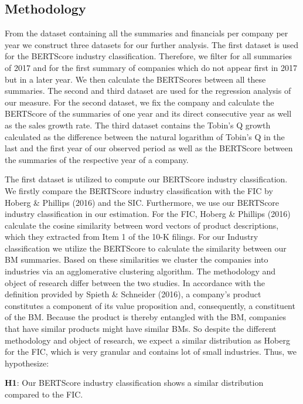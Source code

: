 \documentclass[
]{article}
\begin{document}
\subsection{Methodology}\label{methodology}

From the dataset containing all the summaries and financials per company
per year we construct three datasets for our further analysis. The first
dataset is used for the BERTScore industry classification. Therefore, we
filter for all summaries of 2017 and for the first summary of companies
which do not appear first in 2017 but in a later year. We then calculate
the BERTScores between all these summaries. The second and third dataset
are used for the regression analysis of our measure. For the second
dataset, we fix the company and calculate the BERTScore of the summaries
of one year and its direct consecutive year as well as the sales growth
rate. The third dataset contains the Tobin's Q growth calculated as the
difference between the natural logarithm of Tobin's Q in the last and
the first year of our observed period as well as the BERTScore between
the summaries of the respective year of a company.

The first dataset is utilized to compute our BERTScore industry
classification. We firstly compare the BERTScore industry classification
with the FIC by Hoberg \& Phillips (2016) and the SIC. Furthermore, we
use our BERTScore industry classification in our estimation. For the
FIC, Hoberg \& Phillips (2016) calculate the cosine similarity between
word vectors of product descriptions, which they extracted from Item 1
of the 10-K filings. For our Industry classification we utilize the
BERTScore to calculate the similarity between our BM summaries. Based on
these similarities we cluster the companies into industries via an
agglomerative clustering algorithm. The methodology and object of
research differ between the two studies. In accordance with the
definition provided by Spieth \& Schneider (2016), a company's product
constitutes a component of its value proposition and, consequently, a
constituent of the BM. Because the product is thereby entangled with the
BM, companies that have similar products might have similar BMs. So
despite the different methodology and object of research, we expect a
similar distribution as Hoberg for the FIC, which is very granular and
contains lot of small industries. Thus, we hypothesize:

\textbf{H1}: Our BERTScore industry classification shows a similar
distribution compared to the FIC.
\end{document}

